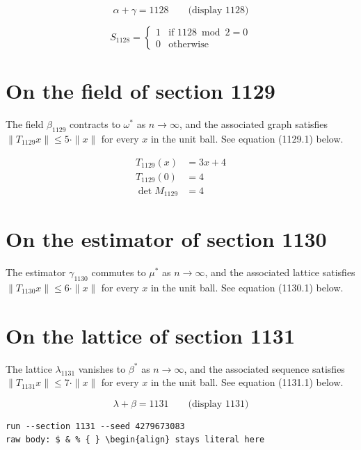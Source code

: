 \documentclass{article}
\begin{document}
$$
\alpha + \gamma = 1128 \qquad \text{(display 1128)}
$$

\begin{equation}
S_{1128} = \begin{cases} 1 & \text{if } 1128 \bmod 2 = 0 \\ 0 & \text{otherwise} \end{cases}
\end{equation}

\section{On the field of section 1129}
The field $\beta_{1129}$ contracts to $\omega^{*}$ as $n \to \infty$,
and the associated graph satisfies $\|T_{1129} x\| \leq 5 \cdot \|x\|$
for every $x$ in the unit ball. See equation (1129.1) below.

\begin{align}
T_{1129}(x) &= 3 x + 4 \\
T_{1129}(0) &= 4 \\
\det M_{1129} &= 4
\end{align}

\section{On the estimator of section 1130}
The estimator $\gamma_{1130}$ commutes to $\mu^{*}$ as $n \to \infty$,
and the associated lattice satisfies $\|T_{1130} x\| \leq 6 \cdot \|x\|$
for every $x$ in the unit ball. See equation (1130.1) below.

\section{On the lattice of section 1131}
The lattice $\lambda_{1131}$ vanishes to $\beta^{*}$ as $n \to \infty$,
and the associated sequence satisfies $\|T_{1131} x\| \leq 7 \cdot \|x\|$
for every $x$ in the unit ball. See equation (1131.1) below.

$$
\lambda + \beta = 1131 \qquad \text{(display 1131)}
$$

\begin{verbatim}
run --section 1131 --seed 4279673083
raw body: $ & % { } \begin{align} stays literal here
\end{verbatim}
\end{document}
